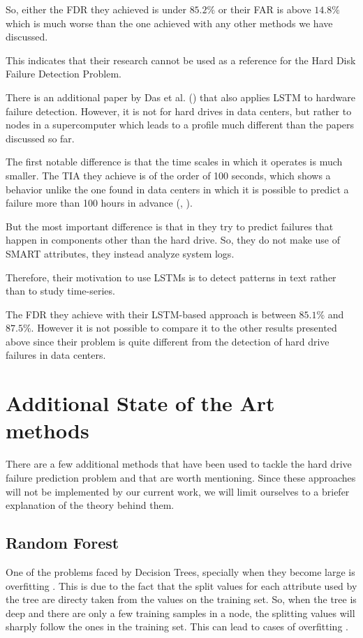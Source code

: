 So, either the FDR they achieved is under $85.2\%$ or their FAR is above $14.8\%$ which is much worse than the one achieved with any other methods we have discussed.

This indicates that their research cannot be used as a reference for the Hard Disk Failure Detection Problem.

There is an additional paper by Das et al. (\cite{das2018desh}) that also applies LSTM to hardware failure detection.
However, it is not for hard drives in data centers, but rather to nodes in a supercomputer which leads to a profile much different than the papers discussed so far.

The first notable difference is that the time scales in which it operates is much smaller.
The TIA they achieve is of the order of 100 seconds, which shows a behavior unlike the one found in data centers in which it is possible to predict a failure more than 100 hours in advance (\cite{Li14}, \cite{Zhu13}).

But the most important difference is that in \cite{das2018desh} they try to predict failures that happen in components other than the hard drive.
So, they do not make use of SMART attributes, they instead analyze system logs.

Therefore, their motivation to use LSTMs is to detect patterns in text rather than to study time-series.

The FDR they achieve with their LSTM-based approach is between $85.1\%$ and $87.5\%$.
However it is not possible to compare it to the other results presented above since their problem is quite different from the detection of hard drive failures in data centers.

\section{Additional State of the Art methods}

There are a few additional methods that have been used to tackle the hard drive failure prediction problem and that are worth mentioning.
Since these approaches will not be implemented by our current work, we will limit ourselves to a briefer explanation of the theory behind them.

\subsection{Random Forest}\label{subsec:randomforest}

One of the problems faced by Decision Trees, specially when they become large is overfitting \cite{ying2019overview}.
This is due to the fact that the split values for each attribute used by the tree are directy taken from the values on the training set.
So, when the tree is deep and there are only a few training samples in a node, the splitting values will sharply follow the ones in the training set.
This can lead to cases of overfitting \cite{Bramer2020}.

